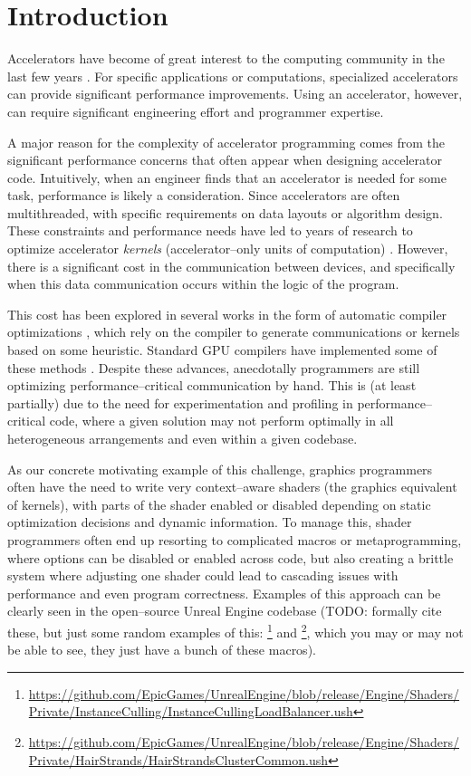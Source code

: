 \section{Introduction}
\label{sec:caimanintro}

Accelerators have become of great interest to the computing community in the last few years .  For specific applications or computations, specialized accelerators can provide significant performance improvements.  Using an accelerator, however, can require significant engineering effort and programmer expertise.

A major reason for the complexity of accelerator programming comes from the significant performance concerns that often appear when designing accelerator code.  Intuitively, when an engineer finds that an accelerator is needed for some task, performance is likely a consideration.  Since accelerators are often multithreaded, with specific requirements on data layouts or algorithm design.  These constraints and performance needs have led to years of research to optimize accelerator \emph{kernels} (accelerator--only units of computation) .  However, there is a significant cost in the communication between devices, and specifically when this data communication occurs within the logic of the program.

This cost has been explored in several works in the form of automatic compiler optimizations , which rely on the compiler to generate communications or kernels based on some heuristic.  Standard GPU compilers have implemented some of these methods .  Despite these advances, anecdotally programmers are still optimizing performance--critical communication by hand.  This is (at least partially) due to the need for experimentation and profiling in performance--critical code, where a given solution may not perform optimally in all heterogeneous arrangements and even within a given codebase.

As our concrete motivating example of this challenge, graphics programmers often have the need to write very context--aware shaders (the graphics equivalent of kernels), with parts of the shader enabled or disabled depending on static optimization decisions and dynamic information.  To manage this, shader programmers often end up resorting to complicated macros or metaprogramming, where options can be disabled or enabled across code, but also creating a brittle system where adjusting one shader could lead to cascading issues with performance and even program correctness.  Examples of this approach can be clearly seen in the open--source Unreal Engine codebase \xxx[dg](TODO: formally cite these, but just some random examples of this: \footnote{\url{https://github.com/EpicGames/UnrealEngine/blob/release/Engine/Shaders/Private/InstanceCulling/InstanceCullingLoadBalancer.ush}} and \footnote{\url{https://github.com/EpicGames/UnrealEngine/blob/release/Engine/Shaders/Private/HairStrands/HairStrandsClusterCommon.ush}}, which you may or may not be able to see, they just have a bunch of these macros).


